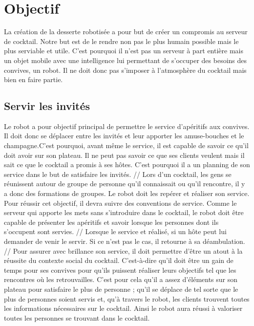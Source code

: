 
\chapter{Objectif}

La création de la desserte robotisée a pour but de créer un compromis au serveur de cocktail. Notre but est de le rendre non pas le plus humain possible mais le plus serviable et utile. C’est pourquoi il n’est pas un serveur à part entière mais un objet mobile avec une intelligence lui permettant de s’occuper des besoins des convives, un robot. Il ne doit donc pas s’imposer à l’atmosphère du cocktail mais bien en faire partie.

\section{Servir les invités}

Le robot a pour objectif principal de permettre le service d’apéritifs aux convives. Il doit donc se déplacer entre les invités et leur apporter les amuse-bouches et le champagne.C’est pourquoi, avant même le service, il est capable de savoir ce qu’il doit avoir sur son plateau. Il ne peut pas savoir ce que ses clients veulent mais il sait ce que le cocktail a promis à ses hôtes. C’est pourquoi il a un planning de son service dans le but de satisfaire les invités.
//
Lors d’un cocktail, les gens se réunissent autour de groupe de personne qu’il connaissait ou qu’il rencontre, il y a donc des formations de groupes. Le robot doit les repérer et réaliser son service. Pour réussir cet objectif, il devra suivre des conventions de service. Comme le serveur qui apporte les mets sans s’introduire dans le cocktail, le robot doit être capable de présenter les apéritifs et savoir lorsque les personnes dont ils s’occupent sont servies. 
//
Lorsque le service et réalisé, si un hôte peut lui demander de venir le servir. Si ce n’est pas le cas, il retourne à sa déambulation.
//
Pour assurer avec brillance son service, il doit permettre d’être un atout à la réussite du contexte social du cocktail. C’est-à-dire qu’il doit être un gain de temps pour ses convives pour qu’ils puissent réaliser leurs objectifs tel que les rencontres où les retrouvailles. C’est pour cela qu’il a assez d’éléments sur son plateau pour satisfaire le plus de personne ; qu’il se déplace de tel sorte que le plus de personnes soient servis et, qu’à travers le robot, les clients trouvent toutes les informations nécessaires sur le cocktail. Ainsi le robot aura réussi à valoriser toutes les personnes se trouvant dans le cocktail.

